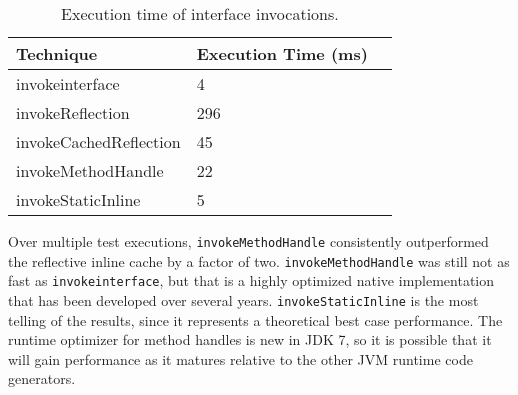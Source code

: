 \begin{table}[htbp]
  \centering
  \begin{tabular}{ | l | l | p{5cm} |}
  \hline
  \textbf{Technique} & \textbf{Execution Time (ms)} \\ \hline
  invokeinterface & 4 \\ \hline
  invokeReflection & 296 \\ \hline
  invokeCachedReflection & 45 \\ \hline
  invokeMethodHandle & 22 \\ \hline
  invokeStaticInline & 5  \\ \hline
  \end{tabular}
  \caption[Invocation Benchmarks]{Execution time of interface invocations.}
  \label{table:invocation-benchmarks}
\end{table}

Over multiple test executions, \texttt{invokeMethodHandle} consistently outperformed the reflective inline cache by a factor of two.  \texttt{invokeMethodHandle} was still not as fast as \texttt{invokeinterface}, but that is a highly optimized native implementation that has been developed over several years.  \texttt{invokeStaticInline} is the most telling of the results, since it represents a theoretical best case performance.  The runtime optimizer for method handles is new in JDK 7, so it is possible that it will gain performance as it matures relative to the other JVM runtime code generators.

